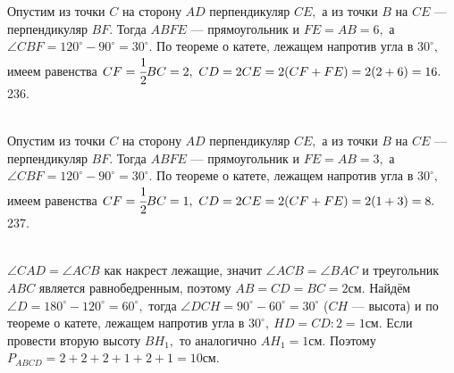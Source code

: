 \documentclass[12pt]{article}
\begin{document}
Опустим из точки $C$ на сторону $AD$ перпендикуляр $CE,$ а из точки $B$ на $CE$ --- перпендикуляр $BF.$ Тогда $ABFE$ --- прямоугольник и $FE=AB=6,$ а $\angle CBF=  120^\circ-90^\circ=30^\circ.$ По теореме о катете, лежащем напротив угла в $30^\circ,$ имеем равенства $CF=\cfrac{1}{2}BC=2,\ CD=2CE=2(CF+FE)=2(2+6)=16.$\\
236. \begin{figure}[ht!]
\end{figure}\\
Опустим из точки $C$ на сторону $AD$ перпендикуляр $CE,$ а из точки $B$ на $CE$ --- перпендикуляр $BF.$ Тогда $ABFE$ --- прямоугольник и $FE=AB=3,$ а $\angle CBF=  120^\circ-90^\circ=30^\circ.$ По теореме о катете, лежащем напротив угла в $30^\circ,$ имеем равенства $CF=\cfrac{1}{2}BC=1,\ CD=2CE=2(CF+FE)=2(1+3)=8.$\\
237. \begin{figure}[ht!]
\end{figure}\\
$\angle CAD=\angle ACB$ как накрест лежащие, значит $\angle ACB=\angle BAC$ и треугольник $ABC$ является равнобедренным, поэтому $AB=CD=BC=2$см. Найдём $\angle D=180^\circ-120^\circ=60^\circ,$ тогда $\angle DCH=90^\circ-60^\circ=30^\circ$ ($CH$ --- высота) и по теореме о катете, лежащем напротив угла в $30^\circ,\ HD=CD:2=1$см. Если провести вторую высоту $BH_1,$ то аналогично $AH_1=1$см. Поэтому $P_{ABCD}=2+2+2+1+2+1=10$см.\newpage\noindent
\end{document}
